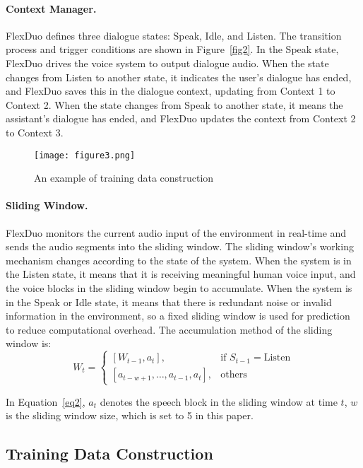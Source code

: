\documentclass[11pt]{article}
\begin{document}
\paragraph{Context Manager.}
FlexDuo defines three dialogue states: Speak, Idle, and Listen. The transition process and trigger conditions are shown in Figure~\ref{fig2}. In the Speak state, FlexDuo drives the voice system to output dialogue audio. When the state changes from Listen to another state, it indicates the user's dialogue has ended, and FlexDuo saves this in the dialogue context, updating from Context 1 to Context 2. When the state changes from Speak to another state, it means the assistant's dialogue has ended, and FlexDuo updates the context from Context 2 to Context 3.



\begin{figure*}[t]
  \texttt{[image: figure3.png]}
  \caption {An example of training data construction}
    \label{fig3}
\end{figure*}

\paragraph{Sliding Window.}
FlexDuo monitors the current audio input of the environment in real-time and sends the audio segments into the sliding window. The sliding window's working mechanism changes according to the state of the system. When the system is in the Listen state, it means that it is receiving meaningful human voice input, and the voice blocks in the sliding window begin to accumulate. When the system is in the Speak or Idle state, it means that there is redundant noise or invalid information in the environment, so a fixed sliding window is used for prediction to reduce computational overhead. The accumulation method of the sliding window is:
\begin{equation}
  \label{eq2}
  W_t =
\begin{cases} 
[W_{t-1}, a_t], & \text{if } S_{t-1} = \text{Listen}\\ 
[a_{t-w+1}, \dots, a_{t-1}, a_t], & \text{others}
\end{cases}
\end{equation}

In Equation~\ref{eq2}, $a_t$ denotes the speech block in the sliding window at time $t$, $w$ is the sliding window size, which is set to 5 in this paper.


\subsection{Training Data Construction}
\end{document}
